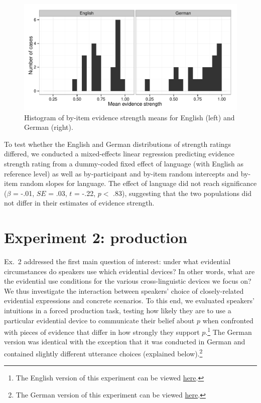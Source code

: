 \documentclass[11pt]{article}
\begin{document}
\begin{figure}
\centering
\includegraphics[width=.9\textwidth]{pics/evidencestrength-histograms}
\caption{Histogram of by-item evidence strength means  for English (left) and German (right).}
\label{fig:evidencestrength}
\end{figure}


To test whether the English and German distributions of strength ratings differed, we conducted a mixed-effects linear regression predicting evidence strength rating from a dummy-coded fixed effect of language (with English as reference level) as well as by-participant and by-item random intercepts and by-item random slopes for language. The effect of language did not reach significance ($\beta$ = -.01, $SE$ = .03, $t$ = -.22, $p <$ .83), suggesting that the two populations did not differ in their estimates of evidence strength.   

\section{Experiment 2: production}


Ex.~2 addressed the first main question of interest: under what evidential circumstances do speakers use which evidential devices? In other words, what are the evidential use conditions for the various cross-linguistic devices we focus on? We thus investigate the interaction between speakers’ choice of closely-related evidential expressions and concrete scenarios.  To this end, we evaluated speakers' intuitions in a forced production task, testing how likely they are to use a particular evidential device to communicate their belief about $p$ when confronted with pieces of evidence that differ in how strongly they support $p$.\footnote{The English version of this experiment can be viewed \href{http://stanford.edu/~jdegen/71_modals_forced_production/modals.html}{here}.} The German version was identical with the exception that it was conducted in German and contained slightly different utterance choices (explained below).\footnote{The German version of this experiment can be viewed \href{http://web.stanford.edu/~jdegen/cgi-bin/3_dp_production/modals.html}{here}.}
\end{document}
